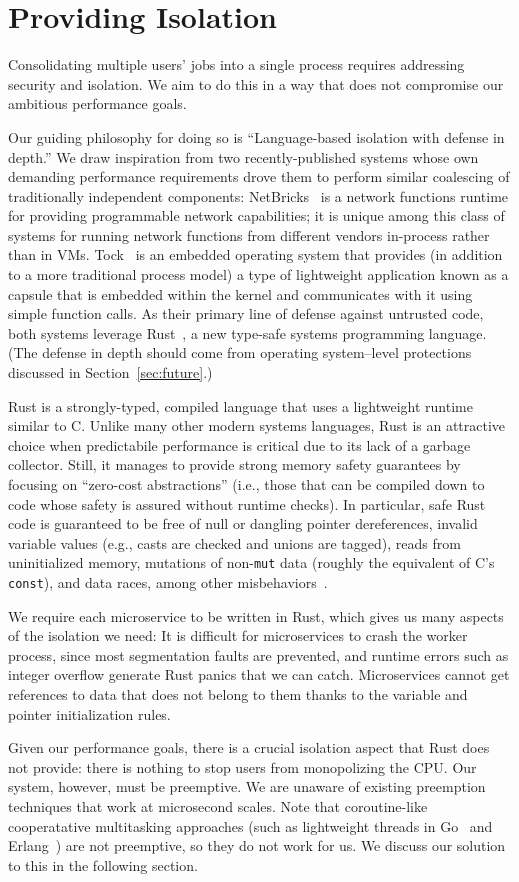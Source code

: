 \section{Providing Isolation}
\label{sec:isolation}

Consolidating multiple users' jobs into a single process requires
addressing security and isolation. We aim to do this in a way that does not
compromise our ambitious performance goals.

Our guiding philosophy for doing so is ``Language-based isolation with defense in depth.''
We draw inspiration from two recently-published systems whose own demanding
performance requirements drove them to perform similar coalescing of traditionally
independent components:  NetBricks~\cite{Panda2016} is a network functions runtime
for providing programmable network capabilities; it is unique among this class of
systems for running network functions from different vendors in-process rather than in VMs.
Tock~\cite{Levy2017} is an embedded operating system that provides (in addition to a
more traditional process model) a type of lightweight application known as a capsule
that is embedded within the kernel and communicates with it using simple function
calls.  As their primary line of defense against untrusted code, both systems
leverage Rust~\cite{www-rustlang}, a new type-safe systems programming language.
(The defense in depth should come from operating system--level protections discussed
in Section~\ref{sec:future}.)

Rust is a strongly-typed, compiled language that uses a lightweight runtime
similar to C.  Unlike many other modern systems languages, Rust is an
attractive choice when predictabile performance is critical due to its
lack of a garbage collector.  Still, it manages to provide strong memory safety
guarantees by focusing on ``zero-cost abstractions'' (i.e., those that can be
compiled down to code whose safety is assured without runtime checks).  In
particular, safe Rust code is guaranteed to be free of null or dangling pointer
dereferences, invalid variable values (e.g., casts are checked and unions are
tagged), reads from uninitialized memory, mutations of non-\texttt{mut} data (roughly
the equivalent of C's \texttt{const}), and data races, among other
misbehaviors~\cite{www-rustlang-ub}.

We require each microservice to be written in Rust, which gives us many aspects of
the isolation we need:  It is difficult for microservices to crash the worker process,
since most segmentation faults are prevented, and runtime errors such as integer
overflow generate Rust panics that we can catch.  Microservices cannot get references
to data that does not belong to them thanks to the variable and pointer initialization
rules.

Given our performance goals, there is a crucial isolation aspect that
Rust does not provide: there is nothing to stop users from monopolizing the CPU\@.
Our system, however, must be preemptive. We are unaware of existing preemption
techniques that work at microsecond scales. Note that coroutine-like
cooperatative multitasking approaches (such as lightweight threads in
Go~\cite{www-golang} and Erlang~\cite{www-erlang}) are not preemptive, so they
do not work for us. We discuss our solution to this in the following section.
